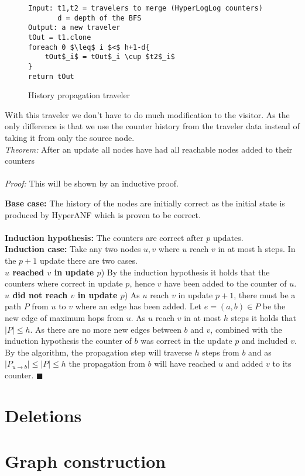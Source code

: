 \begin{figure}[h]
    \begin{lstlisting}[mathescape]
Input: t1,t2 = travelers to merge (HyperLogLog counters)
       d = depth of the BFS
Output: a new traveler
tOut = t1.clone
foreach 0 $\leq$ i $<$ h+1-d{
    tOut$_i$ = tOut$_i \cup $t2$_i$
}
return tOut
    \end{lstlisting}
    \caption{History propagation traveler}
    \label{fig:history_propagation_traveler}
\end{figure}

With this traveler we don't have to do much modification to the visitor. As the only difference is that we use the counter history from the traveler data instead of taking it from only the source node.\\

\textit{Theorem: } After an update all nodes have had all reachable nodes added to their counters \\\\
\textit{Proof: } This will be shown by an inductive proof. 

\begin{addmargin}[2em]{0em}
\textbf{Base case: } The history of the nodes are initially correct as the initial state is produced by HyperANF which is proven to be correct. \\\\
\textbf{Induction hypothesis: } The counters are correct after $p$ updates.\\
\textbf{Induction case: } Take any two nodes $u,v$ where $u$ reach $v$ in at most h steps. In the $p+1$ update there are two cases. \\

\textbf{$u$ reached $v$ in update $p$}) By the induction hypothesis it holds that the counters where correct in update $p$, hence $v$ have been added to the counter of $u$.\\

\textbf{$u$ did not reach $v$ in update $p$}) As $u$ reach $v$ in update $p+1$, there must be a path $P$ from $u$ to $v$ where an edge has been added. Let $e = (a,b) \in P$ be the new edge of maximum hops from $u$. As $u$ reach $v$ in at most $h$ steps it holds that $|P| \leq h$.
 As there are no more new edges between $b$ and $v$, combined with the induction hypothesis the counter of $b$ was correct in the update $p$ and included $v$. By the algorithm, the propagation step will traverse $h$ steps from $b$ and as 
$|P_{u \rightarrow b}| \leq |P| \leq h$ the propagation from $b$ will have reached $u$ and added $v$ to its counter. $\blacksquare$


\end{addmargin}

\section{Deletions}

\section{Graph construction}

